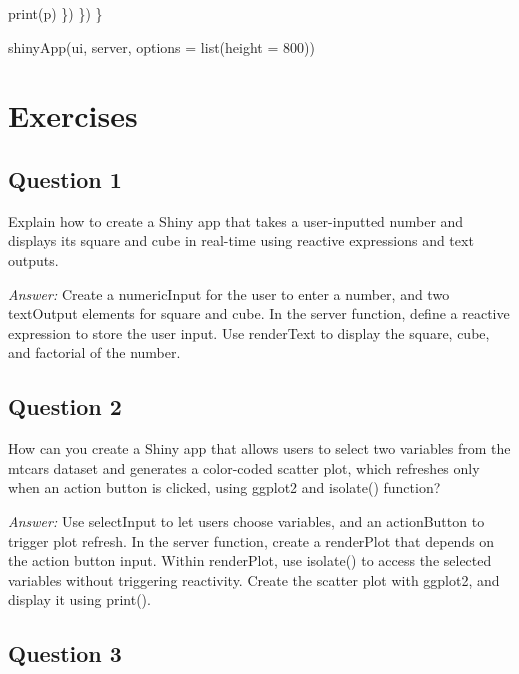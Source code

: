 \documentclass[
]{book}
\newenvironment{Shaded}{\begin{snugshade}}{\end{snugshade}}
\newcommand{\AttributeTok}[1]{\textcolor[rgb]{0.77,0.63,0.00}{#1}}
\newcommand{\DecValTok}[1]{\textcolor[rgb]{0.00,0.00,0.81}{#1}}
\newcommand{\FunctionTok}[1]{\textcolor[rgb]{0.00,0.00,0.00}{#1}}
\newcommand{\NormalTok}[1]{#1}
\begin{document}
\begin{Shaded}
\begin{Highlighting}[]
      \FunctionTok{print}\NormalTok{(p)}
\NormalTok{    \})}
\NormalTok{  \})}
\NormalTok{\}}

\FunctionTok{shinyApp}\NormalTok{(ui, server, }\AttributeTok{options =} \FunctionTok{list}\NormalTok{(}\AttributeTok{height =} \DecValTok{800}\NormalTok{))}
\end{Highlighting}
\end{Shaded}

\hypertarget{exercises}{%
\section{Exercises}\label{exercises}}

\hypertarget{question-1}{%
\subsection{Question 1}\label{question-1}}

Explain how to create a Shiny app that takes a user-inputted number and displays its square and cube in real-time using reactive expressions and text outputs.

\emph{Answer:} Create a numericInput for the user to enter a number, and two textOutput elements for square and cube. In the server function, define a reactive expression to store the user input. Use renderText to display the square, cube, and factorial of the number.

\hypertarget{question-2}{%
\subsection{Question 2}\label{question-2}}

How can you create a Shiny app that allows users to select two variables from the mtcars dataset and generates a color-coded scatter plot, which refreshes only when an action button is clicked, using ggplot2 and isolate() function?

\emph{Answer:} Use selectInput to let users choose variables, and an actionButton to trigger plot refresh. In the server function, create a renderPlot that depends on the action button input. Within renderPlot, use isolate() to access the selected variables without triggering reactivity. Create the scatter plot with ggplot2, and display it using print().

\hypertarget{question-3}{%
\subsection{Question 3}\label{question-3}}
\end{document}
